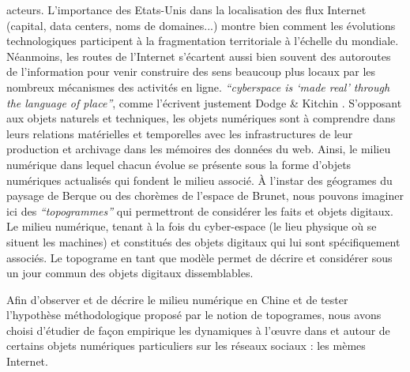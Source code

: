 acteurs. L’importance des Etats-Unis \citep{Zook2001, Cukier1999} dans la localisation des flux Internet (capital, data centers, noms de domaines...) montre bien comment les évolutions technologiques participent à la fragmentation territoriale à l’échelle du mondiale. Néanmoins, les routes de l’Internet s’écartent aussi bien souvent des autoroutes de l’information pour venir construire des sens beaucoup plus locaux par les nombreux mécanismes des activités en ligne. \textit{“cyberspace is ‘made real’ through the language of place”}, comme l’écrivent justement Dodge \& Kitchin \citep{Dodge2007}.
S’opposant aux objets naturels et techniques, les objets numériques sont à comprendre dans leurs relations matérielles et temporelles avec les infrastructures de leur production et archivage dans les mémoires des données du web. Ainsi, le milieu numérique dans lequel chacun évolue se présente sous la forme d’objets numériques actualisés qui fondent le milieu associé. À l’instar des géogrames du paysage de Berque ou des chorèmes de l’espace de Brunet, nous pouvons imaginer ici des \textit{“topogrammes”} qui permettront de considérer les faits et objets digitaux. Le milieu numérique, tenant à la fois du cyber-espace (le lieu physique où se situent les machines) et constitués des objets digitaux qui lui sont spécifiquement associés. Le topograme en tant que modèle permet de décrire et considérer sous un jour commun des objets digitaux dissemblables.

Afin d’observer et de décrire le milieu numérique en Chine et de tester l’hypothèse méthodologique proposé par le notion de topogrames, nous avons choisi d’étudier de façon empirique les dynamiques à l’œuvre dans et autour de certains objets numériques particuliers sur les réseaux sociaux : les mèmes Internet. 
